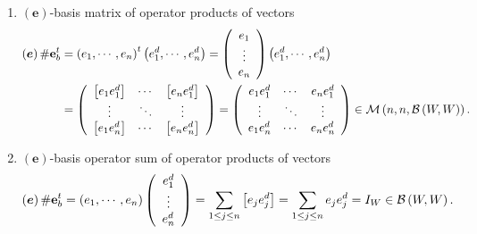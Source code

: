 \documentclass[aps,preprint]{revtex4}%
\newtheorem{notation}[theorem]{Notation}
\begin{document}
\begin{enumerate}
\begin{notation}
\end{notation}

\item $\left(  \boldsymbol{e}\right)  $-basis matrix of operator products of
vectors%
\begin{align}
\left(  \boldsymbol{e}\right)  \#\mathbf{e}_{b}^{t}  &  =\left(  e_{1}%
,\cdots,e_{n}\right)  ^{t}\left(  e_{1}^{d},\cdots,e_{n}^{d}\right)  =\left(
\begin{array}
[c]{c}%
e_{1}\\
\vdots\\
e_{n}%
\end{array}
\right)  \left(  e_{1}^{d},\cdots,e_{n}^{d}\right) \\
&  =\left(
\begin{array}
[c]{ccc}%
\left[  e_{1}e_{1}^{d}\right]  & \cdots & \left[  e_{n}e_{1}^{d}\right] \\
\vdots & \ddots & \vdots\\
\left[  e_{1}e_{n}^{d}\right]  & \cdots & \left[  e_{n}e_{n}^{d}\right]
\end{array}
\right)  =\left(
\begin{array}
[c]{ccc}%
e_{1}e_{1}^{d} & \cdots & e_{n}e_{1}^{d}\\
\vdots & \ddots & \vdots\\
e_{1}e_{n}^{d} & \cdots & e_{n}e_{n}^{d}%
\end{array}
\right)  \in\mathcal{M}\left(  n,n,\mathcal{B}\left(  W,W\right)  \right)
.\nonumber
\end{align}


\item $\left(  \boldsymbol{e}\right)  $-basis operator sum of operator
products of vectors%
\begin{equation}
\left(  \boldsymbol{e}\right)  \#\mathbf{e}_{b}^{t}=\left(  e_{1},\cdots
,e_{n}\right)  \left(
\begin{array}
[c]{c}%
e_{1}^{d}\\
\vdots\\
e_{n}^{d}%
\end{array}
\right)  =\sum_{1\leq j\leq n}\left[  e_{j}e_{j}^{d}\right]  =\sum_{1\leq
j\leq n}e_{j}e_{j}^{d}=I_{W}\in\mathcal{B}\left(  W,W\right)  .
\end{equation}

\end{enumerate}
\end{document}
